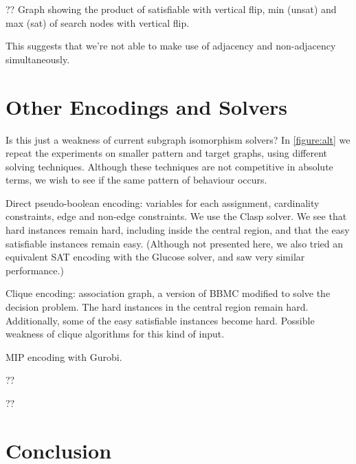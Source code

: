 \documentclass[letterpaper]{article}
\begin{document}
?? Graph showing the product of satisfiable with vertical flip, min (unsat) and max (sat) of search
nodes with vertical flip.

This suggests that we're not able to make use of adjacency and non-adjacency simultaneously.

\lipsum[9]

\lipsum[10]

\section{Other Encodings and Solvers}

\begin{figure*}[t]
    
    \caption{Behaviour of other solvers on the induced variant on smaller graphs, shown in the style of
        \cref{figure:non-induced}. The second row shows the number of search nodes used by the Glasgow
        algorithm, the third row shows the number of decisions made by the Clasp pseudo-boolean solver,
        the fourth row shows the number of search nodes used by a clique encoding, and the fifth a mixed
        integer encoding with Gurobi.}\label{figure:alt}
\end{figure*}

Is this just a weakness of current subgraph isomorphism solvers? In \cref{figure:alt} we repeat the
experiments on smaller pattern and target graphs, using different solving techniques. Although these
techniques are not competitive in absolute terms, we wish to see if the same pattern of behaviour
occurs.

Direct pseudo-boolean encoding: variables for each assignment, cardinality constraints, edge and
non-edge constraints. We use the Clasp solver. We see that hard instances remain hard, including
inside the central region, and that the easy satisfiable instances remain easy. (Although not
presented here, we also tried an equivalent SAT encoding with the Glucose solver, and saw very
similar performance.)

Clique encoding: association graph, a version of BBMC modified to solve the decision problem. The
hard instances in the central region remain hard. Additionally, some of the easy satisfiable
instances become hard. Possible weakness of clique algorithms for this kind of input.

MIP encoding with Gurobi.

?? \citep{Anton:2009}

?? \citep{Lipets:2009}

\section{Conclusion}

\lipsum[11]

\lipsum[12]



\end{document}

